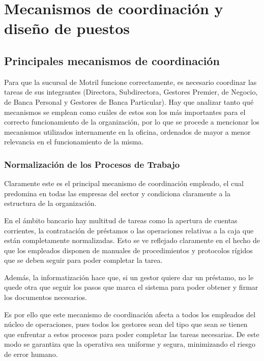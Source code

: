 
\chapter{Mecanismos de coordinación y diseño de puestos}

\section{Principales mecanismos de coordinación}

Para que la sucursal de Motril funcione correctamente, es necesario coordinar las tareas de sus integrantes (Directora, Subdirectora, Gestores Premier, de Negocio, de Banca Personal y Gestores de Banca Particular). Hay que analizar tanto qué mecanismos se emplean como cuáles de estos son los más importantes para el correcto funcionamiento de la organización, por lo que se procede a mencionar los mecanismos utilizados internamente en la oficina, ordenados de mayor a menor relevancia en el funcionamiento de la misma.

\subsection{Normalización de los Procesos de Trabajo}

Claramente este es el principal mecanismo de coordinación empleado, el cual predomina en todas las empresas del sector y condiciona claramente a la estructura de la organización.

En el ámbito bancario hay multitud de tareas como la apertura de cuentas corrientes, la contratación de préstamos o las operaciones relativas a la caja que están completamente normalizadas. Esto se ve reflejado claramente en el hecho de que los empleados disponen de manuales de procedimientos y protocolos rígidos que se deben seguir para poder completar la tarea. 

Además, la informatización hace que, si un gestor quiere dar un préstamo, no le quede otra que seguir los pasos que marca el sistema para poder obtener y firmar los documentos necesarios. 

Es por ello que este mecanismo de coordinación afecta a todos los empleados del núcleo de operaciones, pues todos los gestores sean del tipo que sean se tienen que enfrentar a estos procesos para poder completar las tareas necesarias. De este modo se garantiza que la operativa sea uniforme y segura, minimizando el riesgo de error humano.

